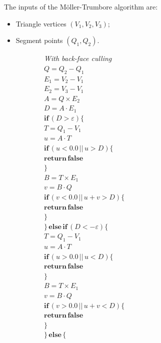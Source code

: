 The inputs of the M\"oller-Trumbore algorithm are:
\begin{itemize}
	\item Triangle vertices $(V_1, V_2, V_3)$;
	\item Segment points $(Q_1, Q_2)$.
\end{itemize}
%
\begin{figure}[htbp]
\hfill
	\begin{subfigure}[t]{.4\linewidth}
		\raggedright
		\textit{With back-face culling}\\
		\vspace{.5em}
		$Q = Q_2 - Q_1$\\
		$E_1 = V_2 - V_1$\\
		$E_2 = V_3 - V_1$\\
		$A = Q \times E_2$\\
		$D = A \cdot E_1$\\
		$\mathbf{if} \, (D > \varepsilon) \{$\\
		\quad $T = Q_1 - V_1$\\
		\quad $u = A \cdot T$\\
		\quad $\mathbf{if} \, (u < 0.0 \, || \, u > D) \{$\\
		\quad \quad $\mathbf{return \, false}$\\
		\quad $\}$\\
		\quad $B = T \times E_1$\\
		\quad $v = B \cdot Q$\\
		\quad $\mathbf{if} \, (v < 0.0 \, || \, u + v > D) \{$\\
		\quad \quad $\mathbf{return \, false}$\\
		\quad $\}$\\
		$\} \, \mathbf{else \, if} \, (D < -\varepsilon) \{$\\
		\quad $T = Q_1 - V_1$\\
		\quad $u = A \cdot T$\\
		\quad $\mathbf{if} \, (u > 0.0 \, || \, u < D) \{$\\
		\quad \quad $\mathbf{return \, false}$\\
		\quad $\}$\\
		\quad $B = T \times E_1$\\
		\quad $v = B \cdot Q$\\
		\quad $\mathbf{if} \, (v > 0.0 \, || \, u + v < D) \{$\\
		\quad \quad $\mathbf{return \, false}$\\
		\quad $\}$\\
		$\} \, \mathbf{else} \, \{$\\

\end{subfigure}
\end{figure}
